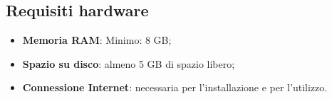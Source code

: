 \subsection{Requisiti hardware}
\begin{itemize}
  \item \textbf{Memoria RAM}: Minimo: 8 GB;
  \item \textbf{Spazio su disco}: almeno 5 GB di spazio libero;
  \item \textbf{Connessione Internet}: necessaria per l'installazione e per l'utilizzo.
\end{itemize}